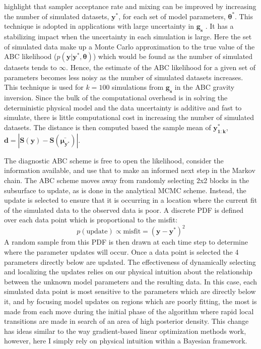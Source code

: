 \citet{Sisson2010a} highlight that sampler acceptance rate and mixing can be improved by increasing the number of simulated datasets, $\bm{y^*}$, for each set of model parameters, $\bm{\theta^*}$. This technique is adopted in applications with large uncertainty in $\bm{g_s}$ \citep{Ratmann2009,Wood2010}. It has a stabilizing impact when the uncertainty in each simulation is large. Here the set of simulated data make up a Monte Carlo approximation to the true value of the ABC likelihood ($p(\bm{y}|\bm{y^*},\bm{\theta})$) which would be found as the number of simulated datasets tends to $\infty$. Hence, the estimate of the ABC likelihood for a given set of parameters becomes less noisy as the number of simulated datasets increases. This technique is used for $k = 100$ simulations from $\bm{g_s}$ in the ABC gravity inversion. Since the bulk of the computational overhead is in solving the deterministic physical model and the data uncertainty is additive and fast to simulate, there is little computational cost in increasing  the number of simulated datasets. The distance is then computed based the sample mean of $\bm{y^*_{1:k}}$, $\bm{d} = |\bm{S}(\bm{y})-\bm{S}(\bm{\bar{\mu_{y^*}}})|$. \par

The diagnostic ABC scheme is free to open the likelihood, consider the information available, and use that to make an informed next step in the Markov chain. The ABC scheme moves away from randomly selecting 2x2 blocks in the subsurface to update, as is done in the analytical MCMC scheme. Instead, the update is selected to ensure that it is occurring in a location where the current fit of the simulated data to the observed data is poor. A discrete PDF is defined over each data point which is proportional to the misfit:
\begin{equation}
	p(\text{update}) \propto \text{misfit} = (\bm{y}-\bm{y^*})^2
	\label{misfit}
\end{equation}
A random sample from this PDF is then drawn at each time step to determine where the parameter updates will occur. Once a data point is selected the 4 parameters directly below are updated. The effectiveness of dynamically selecting and localizing the updates relies on our physical intuition about the relationship between the unknown model parameters and the resulting data. In this case, each simulated data point is most sensitive to the parameters which are directly below it, and by focusing model updates on regions which are poorly fitting, the most is made from each move during the initial phase of the algorithm where rapid local transitions are made in search of an area of high posterior density. This change has ideas similar to the way gradient-based linear optimization methods work, however, here I simply rely on physical intuition within a Bayesian framework. \par

